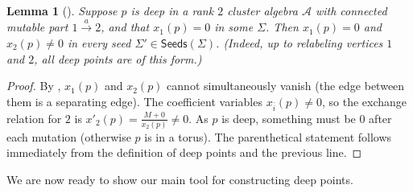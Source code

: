 \documentclass{amsart}
\newcommand{\seed}{\Sigma}
\newcommand{\mut}{\mathrm{mut}}
\newcommand{\var}{\mathcal{A}}
\newcommand{\seeds}{\mathsf{Seeds}}
\numberwithin{equation}{section}
\newtheorem{lemma}[theorem]{Lemma}
\theoremstyle{definition}
\newcommand{\JS}[1]{\textcolor{teal}{[JS: \footnotesize #1]}}
\newcommand{\cS}[1]{\textcolor{purple}{[SN: \footnotesize $\blacksquare$ #1 $\blacksquare$]}}
\begin{document}
\begin{lemma}[{\cite[Corollary 4.2]{beyer-muller}}]\label{lem:zeroes-sticky-rank-2}
Suppose $p$ is deep in a rank $2$ cluster algebra $\var$ with connected mutable part $1 \stackrel{a}{\rightarrow} 2$, and that $x_{1}(p)=0$ in some $\seed$. 
Then $x_{1}(p)=0$ and $x_{2}(p) \neq 0$ in every seed $\seed' \in \seeds(\seed)$. 
(Indeed, up to relabeling vertices $1$ and $2$, all deep points are of this form.)
\end{lemma}
\begin{proof}
By \cite[Corollary 5.4]{muller}, $x_{1}(p)$ and $x_{2}(p)$ cannot simultaneously vanish (the edge between them is a separating edge). %
The coefficient variables $x_{\bar{i}}(p)\neq0$, so the exchange relation for $2$ is $x'_{2}(p) = \frac{M + 0}{x_{2}(p)} \neq 0.$
As $p$ is deep, something must be $0$ after each mutation (otherwise $p$ is in a torus). The parenthetical statement follows immediately from the definition of deep points and the previous line. 
\end{proof}




We are now ready to show our main tool for constructing deep points.
\end{document}

